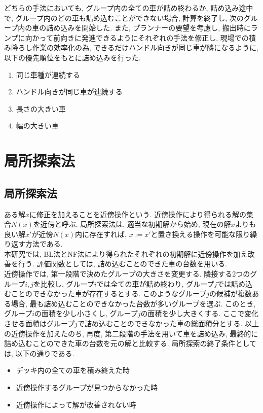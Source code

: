 どちらの手法においても, グループ内の全ての車が詰め終わるか, 詰め込み途中で, グループ内のどの車も詰め込むことができない場合, 計算を終了し, 次のグループ内の車の詰め込みを開始した. 
また, プランナーの要望を考慮し, 搬出時にランプに向かって前向きに発進できるようにそれぞれの手法を修正し,  現場での積み降ろし作業の効率化の為, できるだけハンドル向きが同じ車が隣になるように, 以下の優先順位をもとに詰め込みを行った. 
\begin{enumerate}
    \item 同じ車種が連続する
    \item ハンドル向きが同じ車が連続する
    \item 長さの大きい車
    \item 幅の大きい車
\end{enumerate}


\section{局所探索法}
\subsection*{局所探索法}
ある解$x$に修正を加えることを近傍操作という\cite{local-search}. 
近傍操作により得られる解の集合$N(x)$を近傍と呼ぶ. 
局所探索法は, 適当な初期解から始め, 現在の解$x$よりも良い解$x'$が近傍$N(x)$内に存在すれば, $x:=x'$と置き換える操作を可能な限り繰り返す方法である. \\

本研究では, BL法とNF法により得られたそれぞれの初期解に近傍操作を加え改善を行う. 
評価関数としては, 詰め込むことのできた車の台数を用いる. \\
近傍操作では, 第一段階で決めたグループの大きさを変更する. 
隣接する2つのグループ$i,j$を比較し, グループ$i$では全ての車が詰め終わり, グループ$j$では詰め込むことのできなかった車が存在するとする. 
このようなグループ$j$の候補が複数ある場合, 最も詰め込むことのできなかった台数が多いグループを選ぶ. 
このとき, グループ$i$の面積を少し小さくし, グループ$j$の面積を少し大きくする. 
ここで変化させる面積はグループ$j$で詰め込むことのできなかった車の総面積分とする. 
以上の近傍操作を加えたのち, 再度, 第二段階の手法を用いて車を詰め込み, 最終的に詰め込むことのできた車の台数を元の解と比較する. 
局所探索の終了条件としては, 以下の通りである. 
\begin{itemize}
    \item デッキ内の全ての車を積み終えた時
    \item 近傍操作するグループが見つからなかった時
    \item 近傍操作によって解が改善されない時
\end{itemize}